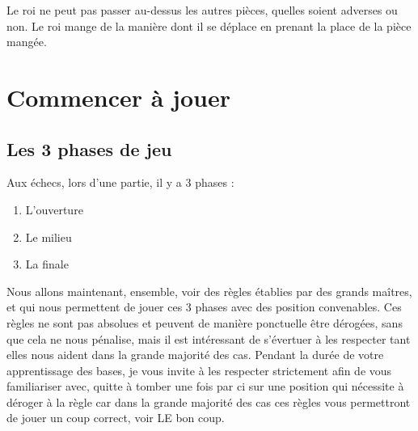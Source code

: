 \documentclass[a5paper,openany,twocolumn]{book}%
\begin{document}
Le roi ne peut pas passer au-dessus les autres pièces, quelles soient adverses ou non. Le roi mange de la manière dont il se déplace en prenant la place de la pièce mangée. 


\onecolumn

\newpage \thispagestyle{empty}
\strut
\newpage \thispagestyle{empty}

\twocolumn

\part{Commencer à jouer}

\onecolumn

\newpage \thispagestyle{empty}
\strut
\newpage \thispagestyle{empty}

\twocolumn

\chapter{Les 3 phases de jeu}

Aux échecs, lors d'une partie, il y a 3 phases :

\begin{enumerate}

\item{L'ouverture}

\item{Le milieu}

\item{La finale}

\end{enumerate}

Nous allons maintenant, ensemble, voir des règles établies par des grands maîtres, et qui nous permettent de jouer ces 3 phases avec des position convenables. Ces règles ne sont pas absolues et peuvent de manière ponctuelle être dérogées, sans que cela ne nous pénalise, mais il est intéressant de s’évertuer à les respecter tant elles nous aident dans la grande majorité des cas. Pendant la durée de votre apprentissage des bases, je vous invite à les respecter strictement afin de vous familiariser avec, quitte à tomber une fois par ci sur une position qui nécessite à déroger à la règle car dans la grande majorité des cas ces règles vous permettront de jouer un coup correct, voir LE bon coup.
\end{document}
